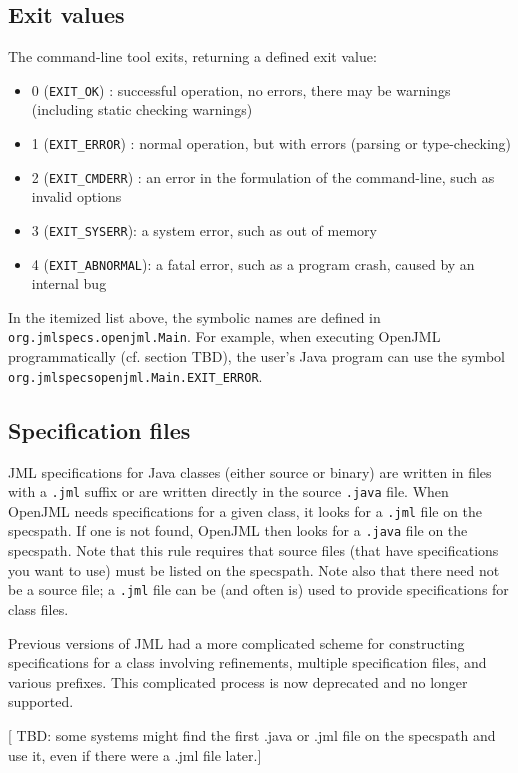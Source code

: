 \subsection{Exit values}
The command-line tool exits, returning a defined exit value:
\begin{itemize}
\item 0 ({\tt EXIT\_OK}) : successful operation, no errors, there may be warnings (including static checking warnings)
\item 1 ({\tt EXIT\_ERROR}) : normal operation, but with errors (parsing or type-checking)
\item 2 ({\tt EXIT\_CMDERR}) : an error in the formulation of the command-line, such as invalid options
\item 3 ({\tt EXIT\_SYSERR}): a system error, such as out of memory
\item 4 ({\tt EXIT\_ABNORMAL}): a fatal error, such as a program crash, caused by an internal bug
\end{itemize}
In the itemized list above, the symbolic names are defined in {\tt org.jmlspecs.openjml.Main}. For example, when executing OpenJML programmatically (cf. section TBD), the user's Java program can use the 
symbol {\tt org.jmlspecsopenjml.Main.EXIT\_ERROR}.

\subsection{Specification files}
\label{SpecFiles}

JML specifications for Java classes (either source or binary) are written in files with a {\tt .jml} suffix or are written directly in the source {\tt .java} file.
When OpenJML needs specifications for a given class, it looks for a {\tt .jml} file on the specspath. If one is not found, OpenJML then looks for a {\tt .java}
file on the specspath. Note that this rule requires that source files (that have specifications you want to use) must be listed on the specspath. Note also that there 
need not be a source file; a {\tt .jml} file can be (and often is) used to provide specifications for class files.

Previous versions of JML had a more complicated scheme for constructing specifications for a class involving refinements, multiple specification files, and various prefixes. This complicated process is now deprecated and no longer supported.

[ TBD: some systems might find the first .java or .jml file on the specspath and use it, even if there were a .jml file later.]


